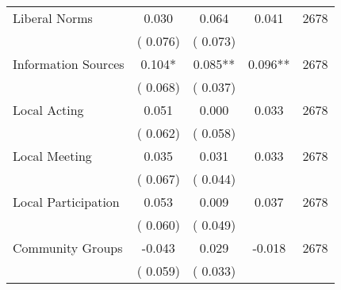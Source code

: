 \begin{tabular}{l*{4}{c}}
 Liberal Norms &              0.030 &         0.064 &           0.041 & 2678                       \\  
                 &        (       0.076)                   &        (       0.073)                        &                                                             &                                                      \\      

 Information Sources &              0.104* &         0.085** &           0.096** & 2678                       \\  
                 &        (       0.068)                   &        (       0.037)                        &                                                             &                                                      \\      

 Local Acting &              0.051 &         0.000 &           0.033 & 2678                       \\  
                 &        (       0.062)                   &        (       0.058)                        &                                                             &                                                      \\      

 Local Meeting &              0.035 &         0.031 &           0.033 & 2678                       \\  
                 &        (       0.067)                   &        (       0.044)                        &                                                             &                                                      \\      

 Local Participation &              0.053 &         0.009 &           0.037 & 2678                       \\  
                 &        (       0.060)                   &        (       0.049)                        &                                                             &                                                      \\      

 Community Groups &             -0.043 &         0.029 &          -0.018 & 2678                       \\  
                 &        (       0.059)                   &        (       0.033)                        &                                                             &                                                      \\      

\hline \end{tabular}                                                                                                              
